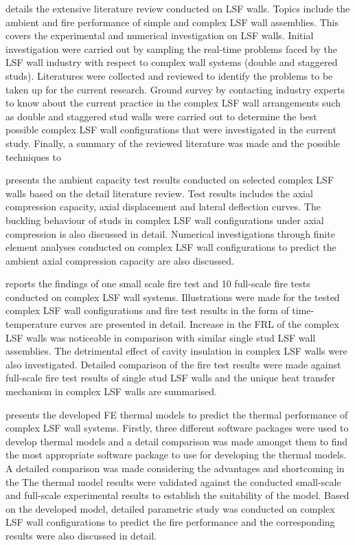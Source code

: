 \textbf{} details the extensive literature review conducted on LSF walls. Topics include the ambient and fire performance of simple and complex LSF wall assemblies. This covers the experimental and numerical investigation on LSF walls. Initial investigation were carried out by sampling the real-time problems faced by the LSF wall industry with respect to complex wall systems (double and staggered studs). Literatures were collected and reviewed to identify the problems to be taken up for the current research. Ground survey by contacting industry experts to know about the current practice in the complex LSF wall arrangements such as double and staggered stud walls were carried out to determine the best possible complex LSF wall configurations that were investigated in the current study. Finally, a summary of the reviewed literature was made and the possible techniques to 

\textbf{} presents the ambient capacity test results conducted on selected complex LSF walls based on the detail literature review. Test results includes the axial compression capacity, axial displacement and lateral deflection curves. The buckling behaviour of studs in complex LSF wall configurations under axial compression is also discussed in detail. Numerical investigations through finite element analyses conducted on complex LSF wall configurations to predict the ambient axial compression capacity are also discussed. 

\textbf{} reports the findings of one small scale fire test and 10 full-scale fire tests conducted on complex LSF wall systems. Illustrations were made for the tested complex LSF wall configurations and fire test results in the form of time-temperature curves are presented in detail. Increase in the FRL of the complex LSF walls was noticeable in comparison with similar single stud LSF wall assemblies. The detrimental effect of cavity insulation in complex LSF walls were also investigated. Detailed comparison of the fire test results were made against full-scale fire test results of single stud LSF walls and the unique heat transfer mechanism in complex LSF walls are summarised. 

\textbf{} presents the developed FE thermal models to predict the thermal performance of complex LSF wall systems. Firstly, three different software packages were used to develop thermal models and a detail comparison was made amongst them to find the most appropriate software package to use for developing the thermal models. A detailed comparison was made considering the advantages and shortcoming in the  The thermal model results were validated against the conducted small-scale and full-scale experimental results to establish the suitability of the model. Based on the developed model, detailed parametric study was conducted on complex LSF wall configurations to predict the fire performance and the corresponding results were also discussed in detail.

